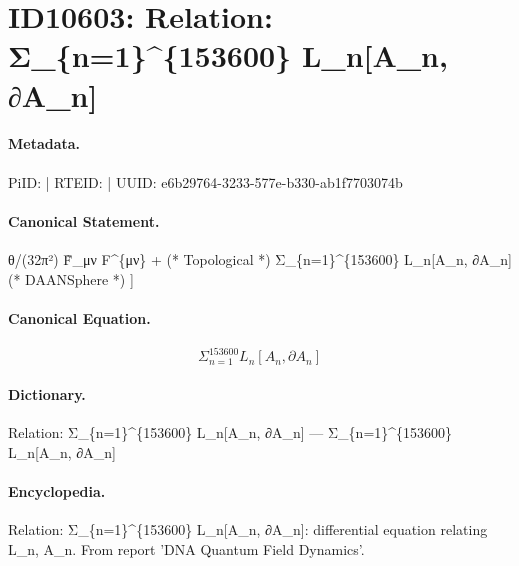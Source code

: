 \section*{ID10603: Relation: Σ\_\{n=1\}\textasciicircum{}\{153600\} L\_n[A\_n, ∂A\_n]}
\paragraph{Metadata.}
PiID:  | RTEID:  | UUID: e6b29764-3233-577e-b330-ab1f7703074b

\paragraph{Canonical Statement.}
θ/(32π²) F̃\_μν F\textasciicircum{}\{μν\} + (* Topological *) Σ\_\{n=1\}\textasciicircum{}\{153600\} L\_n[A\_n, ∂A\_n] (* DAANSphere *) ]

\paragraph{Canonical Equation.}
\[
Σ_{n=1}^{153600} L_n[A_n, ∂A_n]
\]

\paragraph{Dictionary.}
Relation: Σ\_\{n=1\}\textasciicircum{}\{153600\} L\_n[A\_n, ∂A\_n] — Σ\_\{n=1\}\textasciicircum{}\{153600\} L\_n[A\_n, ∂A\_n]

\paragraph{Encyclopedia.}
Relation: Σ\_\{n=1\}\textasciicircum{}\{153600\} L\_n[A\_n, ∂A\_n]: differential equation relating L\_n, A\_n. From report 'DNA Quantum Field Dynamics'.
